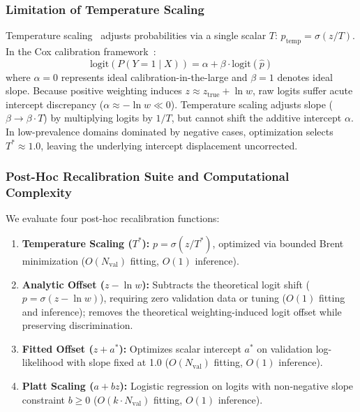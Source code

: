 \documentclass[preprint,12pt]{elsarticle}
\begin{document}
\subsubsection{Limitation of Temperature Scaling}
Temperature scaling~\cite{guo2017calibration} adjusts probabilities via a single scalar $T$: $p_{\text{temp}} = \sigma(z / T)$. In the Cox calibration framework~\cite{vancalster2019calibration, steyerberg2010assessing}:
\begin{equation}
\text{logit}(P(Y = 1 \mid X)) = \alpha + \beta \cdot \text{logit}(\hat{p})
\label{eq:cox_calibration}
\end{equation}
where $\alpha = 0$ represents ideal calibration-in-the-large and $\beta = 1$ denotes ideal slope. Because positive weighting induces $z \approx z_{\text{true}} + \ln w$, raw logits suffer acute intercept discrepancy ($\alpha \approx -\ln w \ll 0$). Temperature scaling adjusts slope ($\beta \to \beta \cdot T$) by multiplying logits by $1/T$, but cannot shift the additive intercept $\alpha$. In low-prevalence domains dominated by negative cases, optimization selects $T^* \approx 1.0$, leaving the underlying intercept displacement uncorrected.

\subsubsection{Post-Hoc Recalibration Suite and Computational Complexity}
We evaluate four post-hoc recalibration functions:
\begin{enumerate}
    \item \textbf{Temperature Scaling ($T^*$):} $p = \sigma(z / T^*)$, optimized via bounded Brent minimization ($O(N_{\mathrm{val}})$ fitting, $O(1)$ inference).
    \item \textbf{Analytic Offset ($z - \ln w$):} Subtracts the theoretical logit shift ($p = \sigma(z - \ln w)$), requiring zero validation data or tuning ($O(1)$ fitting and inference); removes the theoretical weighting-induced logit offset while preserving discrimination.
    \item \textbf{Fitted Offset ($z + a^*$):} Optimizes scalar intercept $a^*$ on validation log-likelihood with slope fixed at 1.0 ($O(N_{\mathrm{val}})$ fitting, $O(1)$ inference).
    \item \textbf{Platt Scaling ($a + bz$):} Logistic regression on logits with non-negative slope constraint $b \ge 0$ ($O(k \cdot N_{\mathrm{val}})$ fitting, $O(1)$ inference).
\end{enumerate}
\end{document}
